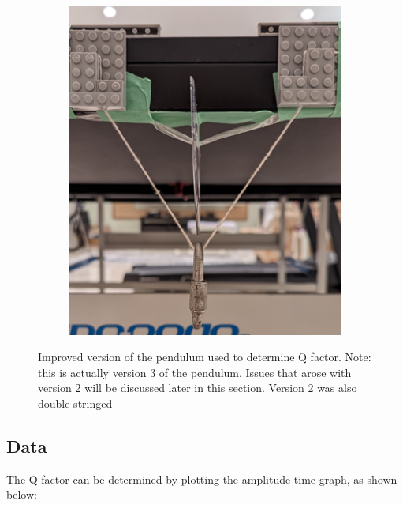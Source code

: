 \documentclass[12pt]{article}
\begin{document}
\begin{figure}[!hptb]
\begin{subfigure}{0.49\textwidth}
        \includegraphics[width=\textwidth]{../figures/exp_setup3_front.png}
    \end{subfigure}
    \caption{\centering Improved version of the pendulum used to determine Q factor. Note: this is actually version 3 of the pendulum. Issues that arose with version 2 will be discussed later in this section. Version 2 was also double-stringed}
    \label{fig:figure 3}
\end{figure}
\newpage

\subsection{Data}
{\color{blue}
The Q factor can be determined by plotting the amplitude-time graph, as shown below:
}
\end{document}
